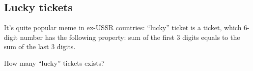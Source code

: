 \subsection{Lucky tickets}

It's quite popular meme in ex-USSR countries: ``lucky'' ticket is a ticket, which 6-digit number has the following property:
sum of the first 3 digits equals to the sum of the last 3 digits.

How many ``lucky'' tickets exists?




